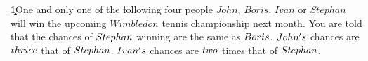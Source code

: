 
\ADD\vi\vj\a
\ADD{}\b
\SUBTRACT\b{1}\c

\question One and only one of the following four people $John$, $Boris$, 
$Ivan$ or $Stephan$ will win the upcoming $Wimbledon$ tennis championship 
next month. You are told that the chances of $Stephan$ winning are the 
same as $Boris$. $John's$ chances are $thrice$ that of $Stephan$. 
$Ivan's$ chances are $two$ times that of $Stephan$.


\watchout

